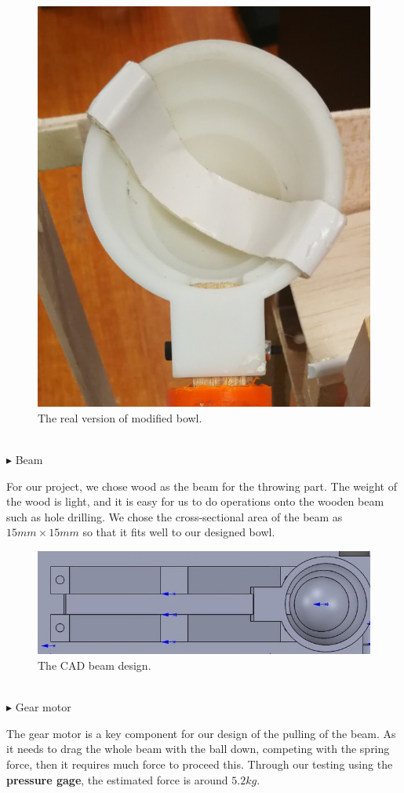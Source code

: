 \documentclass{article}
\begin{document}
\begin{figure}[H]
\centering
\includegraphics[width=0.3\linewidth]{Bowl3}
\caption{The real version of modified bowl.}
\end{figure}
~\\

$\blacktriangleright$ Beam
\par For our project, we chose wood as the beam for the throwing part. The weight of the wood is light, and it is easy for us to do operations onto the wooden beam such as hole drilling. We chose the cross-sectional area of the beam as $15mm\times 15mm$ so that it fits well to our designed bowl.


\begin{figure}[H]
\centering
\includegraphics[width=0.6\linewidth]{arm}
\caption{The CAD beam design.}
\end{figure}
~\\


$\blacktriangleright$ Gear motor\\
\par The gear motor is a key component for our design of the pulling of the beam. As it needs to drag the whole beam with the ball down, competing with the spring force, then it requires much force to proceed this. Through our testing using the \textbf{pressure gage}, the estimated force is around $5.2 kg$.\\
\end{document}
